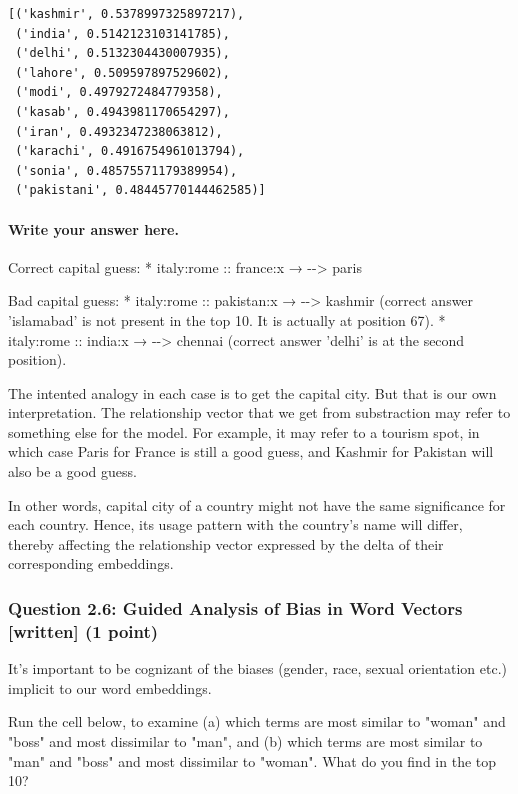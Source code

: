 \documentclass[11pt]{article}
\begin{document}
    \begin{Verbatim}[commandchars=\\\{\},fontsize=\footnotesize]
[('kashmir', 0.5378997325897217),
 ('india', 0.5142123103141785),
 ('delhi', 0.5132304430007935),
 ('lahore', 0.509597897529602),
 ('modi', 0.4979272484779358),
 ('kasab', 0.4943981170654297),
 ('iran', 0.4932347238063812),
 ('karachi', 0.4916754961013794),
 ('sonia', 0.48575571179389954),
 ('pakistani', 0.48445770144462585)]

    \end{Verbatim}

    \paragraph{Write your answer here.}\label{write-your-answer-here.}

Correct capital guess: * italy:rome :: france:x → -\/-\textgreater{}
paris

Bad capital guess: * italy:rome :: pakistan:x → -\/-\textgreater{}
kashmir (correct answer 'islamabad' is not present in the top 10. It is
actually at position 67). * italy:rome :: india:x → -\/-\textgreater{}
chennai (correct answer 'delhi' is at the second position).

The intented analogy in each case is to get the capital city. But that
is our own interpretation. The relationship vector that we get from
substraction may refer to something else for the model. For example, it
may refer to a tourism spot, in which case Paris for France is still a
good guess, and Kashmir for Pakistan will also be a good guess.

In other words, capital city of a country might not have the same
significance for each country. Hence, its usage pattern with the
country's name will differ, thereby affecting the relationship vector
expressed by the delta of their corresponding embeddings.

    \subsubsection{Question 2.6: Guided Analysis of Bias in Word Vectors
{[}written{]} (1
point)}\label{question-2.6-guided-analysis-of-bias-in-word-vectors-written-1-point}

It's important to be cognizant of the biases (gender, race, sexual
orientation etc.) implicit to our word embeddings.

Run the cell below, to examine (a) which terms are most similar to
"woman" and "boss" and most dissimilar to "man", and (b) which terms are
most similar to "man" and "boss" and most dissimilar to "woman". What do
you find in the top 10?
\end{document}
